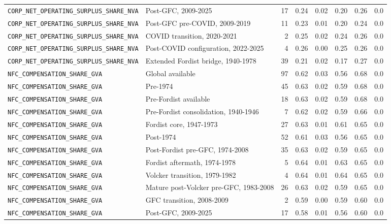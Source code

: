 \begin{landscape}
\begin{longtable}{p{4.4cm}p{3.8cm}rrrrrr}
\\
\nolinkurl{CORP_NET_OPERATING_SURPLUS_SHARE_NVA} & Post-GFC, 2009-2025 & 17 & 0.24 & 0.02 & 0.20 & 0.26 & 0.0
\\
\nolinkurl{CORP_NET_OPERATING_SURPLUS_SHARE_NVA} & Post-GFC pre-COVID, 2009-2019 & 11 & 0.23 & 0.01 & 0.20 & 0.24 & 0.0
\\
\nolinkurl{CORP_NET_OPERATING_SURPLUS_SHARE_NVA} & COVID transition, 2020-2021 & 2 & 0.25 & 0.02 & 0.24 & 0.26 & 0.0
\\
\nolinkurl{CORP_NET_OPERATING_SURPLUS_SHARE_NVA} & Post-COVID configuration, 2022-2025 & 4 & 0.26 & 0.00 & 0.25 & 0.26 & 0.0
\\
\nolinkurl{CORP_NET_OPERATING_SURPLUS_SHARE_NVA} & Extended Fordist bridge, 1940-1978 & 39 & 0.21 & 0.02 & 0.17 & 0.27 & 0.0
\\
\nolinkurl{NFC_COMPENSATION_SHARE_GVA} & Global available & 97 & 0.62 & 0.03 & 0.56 & 0.68 & 0.0
\\
\nolinkurl{NFC_COMPENSATION_SHARE_GVA} & Pre-1974 & 45 & 0.63 & 0.02 & 0.59 & 0.68 & 0.0
\\
\nolinkurl{NFC_COMPENSATION_SHARE_GVA} & Pre-Fordist available & 18 & 0.63 & 0.02 & 0.59 & 0.68 & 0.0
\\
\nolinkurl{NFC_COMPENSATION_SHARE_GVA} & Pre-Fordist consolidation, 1940-1946 & 7 & 0.62 & 0.02 & 0.59 & 0.66 & 0.0
\\
\nolinkurl{NFC_COMPENSATION_SHARE_GVA} & Fordist core, 1947-1973 & 27 & 0.63 & 0.01 & 0.61 & 0.65 & 0.0
\\
\nolinkurl{NFC_COMPENSATION_SHARE_GVA} & Post-1974 & 52 & 0.61 & 0.03 & 0.56 & 0.65 & 0.0
\\
\nolinkurl{NFC_COMPENSATION_SHARE_GVA} & Post-Fordist pre-GFC, 1974-2008 & 35 & 0.63 & 0.02 & 0.59 & 0.65 & 0.0
\\
\nolinkurl{NFC_COMPENSATION_SHARE_GVA} & Fordist aftermath, 1974-1978 & 5 & 0.64 & 0.01 & 0.63 & 0.65 & 0.0
\\
\nolinkurl{NFC_COMPENSATION_SHARE_GVA} & Volcker transition, 1979-1982 & 4 & 0.64 & 0.01 & 0.64 & 0.65 & 0.0
\\
\nolinkurl{NFC_COMPENSATION_SHARE_GVA} & Mature post-Volcker pre-GFC, 1983-2008 & 26 & 0.63 & 0.02 & 0.59 & 0.65 & 0.0
\\
\nolinkurl{NFC_COMPENSATION_SHARE_GVA} & GFC transition, 2008-2009 & 2 & 0.59 & 0.00 & 0.59 & 0.60 & 0.0
\\
\nolinkurl{NFC_COMPENSATION_SHARE_GVA} & Post-GFC, 2009-2025 & 17 & 0.58 & 0.01 & 0.56 & 0.60 & 0.0
\\

\end{longtable}
\end{landscape}
